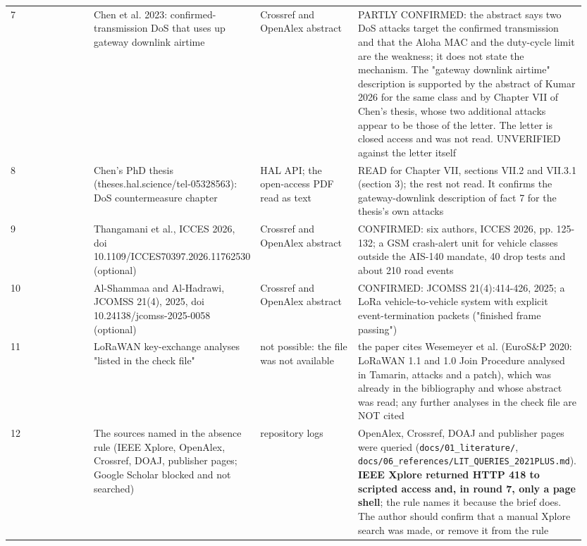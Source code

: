 {\begin{longtable}{p{0.237\linewidth}p{0.237\linewidth}p{0.237\linewidth}p{0.237\linewidth}}
7 & Chen et al. 2023: confirmed-transmission DoS that uses up gateway downlink airtime & Crossref and OpenAlex abstract & PARTLY CONFIRMED: the abstract says two DoS attacks target the confirmed transmission and that the Aloha MAC and the duty-cycle limit are the weakness; it does not state the mechanism. The "gateway downlink airtime" description is supported by the abstract of Kumar 2026 for the same class and by Chapter VII of Chen's thesis, whose two additional attacks appear to be those of the letter. The letter is closed access and was not read. UNVERIFIED against the letter itself \\
8 & Chen's PhD thesis (theses.hal.science/tel-05328563): DoS countermeasure chapter & HAL API; the open-access PDF read as text & READ for Chapter VII, sections VII.2 and VII.3.1 (section 3); the rest not read. It confirms the gateway-downlink description of fact 7 for the thesis's own attacks \\
9 & Thangamani et al., ICCES 2026, doi 10.1109/ICCES70397.2026.11762530 (optional) & Crossref and OpenAlex abstract & CONFIRMED: six authors, ICCES 2026, pp. 125-132; a GSM crash-alert unit for vehicle classes outside the AIS-140 mandate, 40 drop tests and about 210 road events \\
10 & Al-Shammaa and Al-Hadrawi, JCOMSS 21(4), 2025, doi 10.24138/jcomss-2025-0058 (optional) & Crossref and OpenAlex abstract & CONFIRMED: JCOMSS 21(4):414-426, 2025; a LoRa vehicle-to-vehicle system with explicit event-termination packets ("finished frame passing") \\
11 & LoRaWAN key-exchange analyses "listed in the check file" & not possible: the file was not available & the paper cites Wesemeyer et al. (EuroS\&P 2020: LoRaWAN 1.1 and 1.0 Join Procedure analysed in Tamarin, attacks and a patch), which was already in the bibliography and whose abstract was read; any further analyses in the check file are NOT cited \\
12 & The sources named in the absence rule (IEEE Xplore, OpenAlex, Crossref, DOAJ, publisher pages; Google Scholar blocked and not searched) & repository logs & OpenAlex, Crossref, DOAJ and publisher pages were queried (\texttt{docs/01\_literature/}, \texttt{docs/06\_references/LIT\_QUERIES\_2021PLUS.md}). \textbf{IEEE Xplore returned HTTP 418 to scripted access and, in round 7, only a page shell}; the rule names it because the brief does. The author should confirm that a manual Xplore search was made, or remove it from the rule \\
\bottomrule
\end{longtable}}

